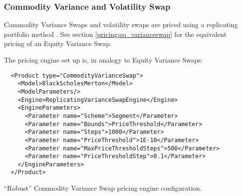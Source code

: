 \subsubsection{Commodity Variance and Volatility Swap}
\label{pricing:com_varianceswap}

Commodity Variance Swaps and volatility swaps are priced using a replicating portfolio method
\cite{Variance_Swaps_JP_Morgan}.  See section \ref{pricing:eq_varianceswap} for the equivalent pricing of an Equity
Variance Swap.

The pricing engine set up is, in analogy to Equity Variance Swaps:

\begin{listing}[h]
\begin{verbatim}
  <Product type="CommodityVarianceSwap">
    <Model>BlackScholesMerton</Model>
    <ModelParameters/>
    <Engine>ReplicatingVarianceSwapEngine</Engine>
    <EngineParameters>
      <Parameter name="Scheme">Segment</Parameter>
      <Parameter name="Bounds">PriceThreshold</Parameter>
      <Parameter name="Steps">1000</Parameter>
      <Parameter name="PriceThreshold">1E-10</Parameter>
      <Parameter name="MaxPriceThresholdSteps">500</Parameter>
      <Parameter name="PriceThresholdStep">0.1</Parameter>
    </EngineParameters>
  </Product>
\end{verbatim}
\caption{``Robust'' Commodity Variance Swap pricing engine configuration.}
\end{listing}

